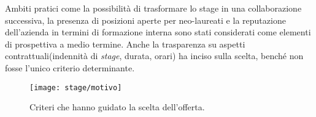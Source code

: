 Ambiti pratici come la possibilità di trasformare lo stage in una collaborazione successiva, la presenza di posizioni aperte per neo-laureati e 
la reputazione dell’azienda in termini di formazione interna sono stati considerati come elementi di prospettiva a medio termine. 
Anche la trasparenza su aspetti contrattuali(indennità di \emph{stage}, durata, orari) ha inciso sulla scelta, benché non fosse l’unico criterio determinante.

\begin{figure}[htbp]
    \centering
    \texttt{[image: stage/motivo]}
    \caption{Criteri che hanno guidato la scelta dell’offerta.}
    \label{fig:motivo}
\end{figure}


